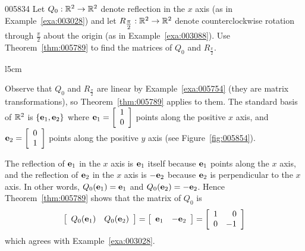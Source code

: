 \begin{example}{}{005834}
Let $Q_{0} : \mathbb{R}^2 \to \mathbb{R}^2$ denote reflection in the $x$ axis (as in Example~\ref{exa:003028}) and let $R_{\tfrac{\pi}{2}} : \mathbb{R}^2 \to \mathbb{R}^2$ denote counterclockwise rotation through $\frac{\pi}{2}$ about the origin (as in Example~\ref{exa:003088}). Use Theorem~\ref{thm:005789} to find the matrices of $Q_{0}$ and $R_{\frac{\pi}{2}}$.


\begin{wrapfigure}[5]{l}{5cm} 
\vspace*{-2em}
\centering

\caption{\label{fig:005854}}
\end{wrapfigure}

\setlength{\rightskip}{0pt plus 200pt}
\begin{solution}
  Observe that $Q_{0}$ and $R_{\frac{\pi}{2}}$ are linear by Example~\ref{exa:005754} (they are matrix transformations), so Theorem~\ref{thm:005789} applies to them. The standard basis of $\mathbb{R}^2$ is $\{\textbf{e}_{1}, \textbf{e}_{2}\}$ where $\textbf{e}_{1} = \left[ \begin{array}{c}
 1 \\
 0
 \end{array} \right]$
 points along the positive $x$ axis, and $\textbf{e}_{2} = \left[ \begin{array}{c}
 0 \\
 1
 \end{array} \right]$
 points along the positive $y$ axis (see Figure~\ref{fig:005854}).

\hspace*{0.5em} The reflection of $\textbf{e}_{1}$ in the $x$ axis is $\textbf{e}_{1}$ itself because $\textbf{e}_{1}$ points along the $x$ axis, and the reflection of $\textbf{e}_{2}$ in the $x$ axis is $-\textbf{e}_{2}$ because $\textbf{e}_{2}$ is perpendicular to the $x$ axis. In other words, $Q_{0}(\textbf{e}_{1}) = \textbf{e}_{1}$ and $Q_{0}(\textbf{e}_{2}) = -\textbf{e}_{2}$. Hence Theorem~\ref{thm:005789} shows that the matrix of $Q_{0}$ is
\begin{equation*}
\left[ \begin{array}{cc}
Q_{0}(\textbf{e}_{1}) & Q_{0}(\textbf{e}_{2})
\end{array} \right] = \left[ \begin{array}{rr}
\textbf{e}_{1} & -\textbf{e}_{2}
\end{array} \right] = \left[ \begin{array}{rr}
1 & 0 \\
0 & -1
\end{array} \right]
\end{equation*}
which agrees with Example~\ref{exa:003028}.


\end{solution}
\end{example}
